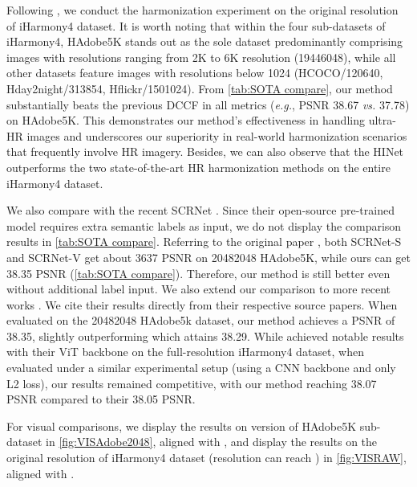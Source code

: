 \documentclass[10pt,journal,twocolumn,twoside]{IEEEtran}
\begin{document}
Following \cite{xue2022dccf, ke2022harmonizer}, we conduct the harmonization experiment on the original resolution of iHarmony4 dataset. It is worth noting that within the four sub-datasets of iHarmony4, HAdobe5K stands out as the sole dataset predominantly comprising images with resolutions ranging from 2K to 6K resolution (19446048), while all other datasets feature images with resolutions below 1024 (HCOCO/120640, Hday2night/313854, Hflickr/1501024). From \cref{tab:SOTA compare}, our method substantially beats the previous DCCF in all metrics (\textit{e.g.}, PSNR 38.67 \textit{vs.} 37.78) on HAdobe5K. This demonstrates our method's effectiveness in handling ultra-HR images and underscores our superiority in real-world harmonization scenarios that frequently involve HR imagery. Besides, we can also observe that the HINet outperforms the two state-of-the-art HR harmonization methods on the entire iHarmony4 dataset.

We also compare with the recent SCRNet \cite{liang2022spatial}. Since their open-source pre-trained model requires extra semantic labels as input, we do not display the comparison results in \cref{tab:SOTA compare}. Referring to the original paper \cite{liang2022spatial}, both SCRNet-S and SCRNet-V get about 3637 PSNR on 20482048 HAdobe5K, while ours can get 38.35 PSNR (\cref{tab:SOTA compare}). Therefore, our method is still better even without additional label input. We also extend our comparison to more recent works \cite{wang2023semi, guerreiro2023pct}. We cite their results directly from their respective source papers. When evaluated on the 20482048 HAdobe5k dataset, our method achieves a PSNR of 38.35, slightly outperforming \cite{wang2023semi} which attains 38.29. While \cite{guerreiro2023pct} achieved notable results with their ViT backbone on the full-resolution iHarmony4 dataset, when evaluated under a similar experimental setup (using a CNN backbone and only L2 loss), our results remained competitive, with our method reaching 38.07 PSNR compared to their 38.05 PSNR.

For visual comparisons, we display the results on  version of HAdobe5K sub-dataset in \cref{fig:VISAdobe2048}, aligned with \cite{cong2022high}, and display the results on the original resolution of iHarmony4 dataset (resolution can reach ) in \cref{fig:VISRAW}, aligned with \cite{xue2022dccf, ke2022harmonizer}.
\end{document}
